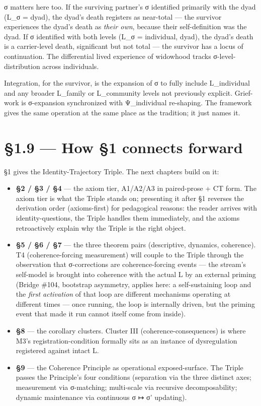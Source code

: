\documentclass[11pt, openany]{book}
\newcommand{\sectionbreak}{\clearpage}
\begin{document}
σ matters here too. If the surviving partner's σ identified primarily with the dyad (L\_\allowbreak{}σ = {dyad}), the dyad's death registers as near-total --- the survivor experiences the dyad's death as \textit{their own}, because their self-definition was the dyad. If σ identified with both levels (L\_\allowbreak{}σ = {individual, dyad}), the dyad's death is a carrier-level death, significant but not total --- the survivor has a locus of continuation. The differential lived experience of widowhood tracks σ-level-distribution across individuals.

Integration, for the survivor, is the expansion of σ to fully include L\_\allowbreak{}individual and any broader L\_\allowbreak{}family or L\_\allowbreak{}community levels not previously explicit. Grief-work is σ-expansion synchronized with Ψ\_\allowbreak{}individual re-shaping. The framework gives the same operation at the same place as the tradition; it just names it.

\sectionbreak

\section{§1.9 --- How §1 connects forward}

§1 gives the Identity-Trajectory Triple. The next chapters build on it:

\begin{itemize}
\item \textbf{§2 / §3 / §4} --- the axiom tier, A1/A2/A3 in paired-prose + CT form. The axiom tier is what the Triple stands on; presenting it after §1 reverses the derivation order (axioms-first) for pedagogical reasons: the reader arrives with identity-questions, the Triple handles them immediately, and the axioms retroactively explain why the Triple is the right object.

\item \textbf{§5 / §6 / §7} --- the three theorem pairs (descriptive, dynamics, coherence). T4 (coherence-forcing measurement) will couple to the Triple through the observation that σ-corrections are coherence-forcing events --- the stream's self-model is brought into coherence with the actual L by an external priming (Bridge \#104, bootstrap asymmetry, applies here: a self-sustaining loop and the \textit{first activation} of that loop are different mechanisms operating at different times --- once running, the loop is internally driven, but the priming event that made it run cannot itself come from inside).

\item \textbf{§8} --- the corollary clusters. Cluster III (coherence-consequences) is where M3's registration-condition formally sits as an instance of dysregulation registered against intact L.

\item \textbf{§9} --- the Coherence Principle as operational exposed-surface. The Triple passes the Principle's four conditions (separation via the three distinct axes; measurement via σ-matching; multi-scale via recursive decomposability; dynamic maintenance via continuous σ ↦ σ' updating).
\end{itemize}
\end{document}
